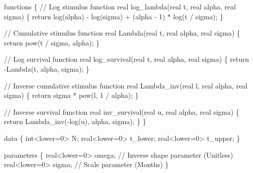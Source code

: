 \documentclass[
  letterpaper,
  DIV=11,
  numbers=noendperiod]{scrartcl}
\newenvironment{Shaded}{\begin{snugshade}}{\end{snugshade}}
\newcommand{\CommentTok}[1]{\textcolor[rgb]{0.37,0.37,0.37}{#1}}
\newcommand{\ControlFlowTok}[1]{\textcolor[rgb]{0.00,0.23,0.31}{#1}}
\newcommand{\DataTypeTok}[1]{\textcolor[rgb]{0.68,0.00,0.00}{#1}}
\newcommand{\DecValTok}[1]{\textcolor[rgb]{0.68,0.00,0.00}{#1}}
\newcommand{\KeywordTok}[1]{\textcolor[rgb]{0.00,0.23,0.31}{#1}}
\newcommand{\NormalTok}[1]{\textcolor[rgb]{0.00,0.23,0.31}{#1}}
\begin{document}
\begin{codelisting}

\caption{\texttt{model3\textbackslash\_prior.stan}}

\begin{Shaded}
\begin{Highlighting}[]
\KeywordTok{functions}\NormalTok{ \{}
  \CommentTok{// Log stimulus function}
  \DataTypeTok{real}\NormalTok{ log\_lambda(}\DataTypeTok{real}\NormalTok{ t, }\DataTypeTok{real}\NormalTok{ alpha, }\DataTypeTok{real}\NormalTok{ sigma) \{}
    \ControlFlowTok{return}\NormalTok{ log(alpha) {-} log(sigma) + (alpha {-} }\DecValTok{1}\NormalTok{) * log(t / sigma);}
\NormalTok{  \}}
  
  \CommentTok{// Cumulative stimulus function}
  \DataTypeTok{real}\NormalTok{ Lambda(}\DataTypeTok{real}\NormalTok{ t, }\DataTypeTok{real}\NormalTok{ alpha, }\DataTypeTok{real}\NormalTok{ sigma) \{}
    \ControlFlowTok{return}\NormalTok{ pow(t / sigma, alpha);}
\NormalTok{  \}}

  \CommentTok{// Log survival function}
  \DataTypeTok{real}\NormalTok{ log\_survival(}\DataTypeTok{real}\NormalTok{ t, }\DataTypeTok{real}\NormalTok{ alpha, }\DataTypeTok{real}\NormalTok{ sigma) \{}
    \ControlFlowTok{return}\NormalTok{ {-}Lambda(t, alpha, sigma);}
\NormalTok{  \}}

  \CommentTok{// Inverse cumulative stimulus function}
  \DataTypeTok{real}\NormalTok{ Lambda\_inv(}\DataTypeTok{real}\NormalTok{ l, }\DataTypeTok{real}\NormalTok{ alpha, }\DataTypeTok{real}\NormalTok{ sigma) \{}
    \ControlFlowTok{return}\NormalTok{ sigma * pow(l, }\DecValTok{1}\NormalTok{ / alpha);}
\NormalTok{  \}}
  
  \CommentTok{// Inverse survival function}
  \DataTypeTok{real}\NormalTok{ inv\_survival(}\DataTypeTok{real}\NormalTok{ u, }\DataTypeTok{real}\NormalTok{ alpha, }\DataTypeTok{real}\NormalTok{ sigma) \{}
    \ControlFlowTok{return}\NormalTok{ Lambda\_inv({-}log(u), alpha, sigma);}
\NormalTok{  \}}
\NormalTok{\}}

\KeywordTok{data}\NormalTok{ \{}
  \DataTypeTok{int}\NormalTok{\textless{}}\KeywordTok{lower}\NormalTok{=}\DecValTok{0}\NormalTok{\textgreater{} N;}
  \DataTypeTok{real}\NormalTok{\textless{}}\KeywordTok{lower}\NormalTok{=}\DecValTok{0}\NormalTok{\textgreater{} t\_lower;}
  \DataTypeTok{real}\NormalTok{\textless{}}\KeywordTok{lower}\NormalTok{=}\DecValTok{0}\NormalTok{\textgreater{} t\_upper;}
\NormalTok{\}}

\KeywordTok{parameters}\NormalTok{ \{}
  \DataTypeTok{real}\NormalTok{\textless{}}\KeywordTok{lower}\NormalTok{=}\DecValTok{0}\NormalTok{\textgreater{} omega; }\CommentTok{// Inverse shape parameter (Unitless)}
  \DataTypeTok{real}\NormalTok{\textless{}}\KeywordTok{lower}\NormalTok{=}\DecValTok{0}\NormalTok{\textgreater{} sigma; }\CommentTok{// Scale parameter (Months)}
\NormalTok{\}}


\end{Highlighting}
\end{Shaded}
\end{codelisting}
\end{document}

